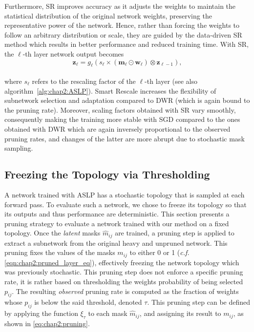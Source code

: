Furthermore, \ac{SR} improves accuracy as it adjusts the weights to maintain the
statistical distribution of the original network weights, preserving the
representative power of the network. Hence, rather than forcing the weights to
follow an arbitrary distribution or scale, they are guided by the data-driven
\ac{SR} method which results in better performance and reduced training time.
With \ac{SR}, the $\ell$-th layer network output becomes \\

\begin{equation}
  \mathbf{z}_{\ell} = g_\ell(s_\ell \times (\bm{m}_\ell \odot \bm{w}_\ell) \otimes \mathbf{z}_{\ell-1}),
\end{equation}\\

\noindent where $s_\ell$ refers to the rescaling factor  of the $\ell$-th layer
(see also algorithm~\ref{alg:chap2:ASLP}). Smart Rescale increases the
flexibility of subnetwork selection and adaptation compared to \ac{DWR} (which
is again bound to the pruning rate). Moreover, scaling factors obtained with
\ac{SR} vary smoothly, consequently making the training more stable with
\ac{SGD} compared to the ones obtained with \ac{DWR} which are again inversely
proportional to the observed pruning rates, and changes of the latter are more
abrupt due to stochastic mask sampling. \\


\subsection{Freezing the Topology via Thresholding}
\label{sec:chap2:freezing_topology}

A network trained with \ac{ASLP} has a stochastic topology that is sampled at
each forward pass. To evaluate such a network, we chose to freeze its topology
so that its outputs and thus performance are deterministic. This section
presents a pruning strategy to evaluate a network trained with our method on a
fixed topology. Once the \emph{latent} masks $\hat{m}_{ij}$ are trained, a
pruning step is applied to extract a subnetwork from the original heavy and
unpruned network. This pruning fixes the values of the masks $m_{ij}$ to either
0 or 1 (\emph{c.f.} \cref{eqn:chap2:pruned_layer_eq}), effectively freezing the
network topology which was previously stochastic. This pruning step does not
enforce a specific pruning rate, it is rather based on thresholding the weights
probability of being selected $p_{ij}$. The resulting \emph{observed} pruning
rate is computed as the fraction of weights whose $p_{ij}$ is below the said
threshold, denoted $\tau$. This pruning step can be defined by applying the
function $\xi_\tau$ to each mask $\hat{m}_{ij}$, and assigning its result to
$m_{ij}$, as shown in \cref{eq:chap2:pruning}.\\


